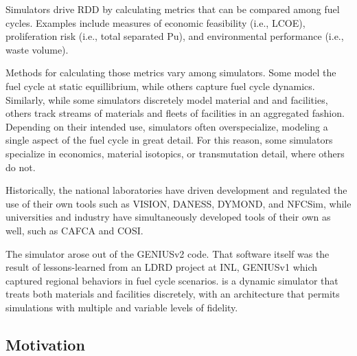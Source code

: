 

Simulators drive \gls{RDD} by calculating metrics that can be compared among fuel 
cycles. Examples include measures of economic feasibility (i.e., \gls{LCOE}), 
proliferation risk (i.e., total separated Pu), and environmental performance 
(i.e., waste volume). 

Methods for calculating those metrics vary among simulators. Some model the 
fuel cycle at static equillibrium, while others capture fuel cycle dynamics.  
Similarly, while some simulators discretely model material and and facilities, 
others track streams of materials and fleets of facilities in an aggregated 
fashion. Depending on their intended use, simulators often overspecialize, 
modeling a single aspect of the fuel cycle in great detail. For this reason, 
some simulators specialize in economics, material isotopics, or transmutation 
detail, where others do not. 

Historically, the national laboratories have driven development and regulated 
the use of their own tools such as \gls{VISION}\cite{jacobson_verifiable_2010}, 
\gls{DANESS}\cite{van_den_durpel_daness_2009}, 
\gls{DYMOND}\cite{modeling_yacout_2005}, and 
\gls{NFCSim}\cite{schneider_nfcsim:_2005}, while universities and industry have 
simultaneously developed tools of their own as well, such as 
\gls{CAFCA}\cite{guerin_benchmark_2006} and \gls{COSI}\cite{cosi}.

The \Cyclus simulator arose out of the 
\gls{GENIUSv2}\cite{oliver_studying_2009,huff_geniusv2_2009} code. That software 
itself was the result of lessons-learned from an \gls{LDRD} project at 
\gls{INL}, 
\gls{GENIUSv1}\cite{dunzik-gougar_global_2007,jain_transitioning_2006} which 
captured regional behaviors in fuel cycle scenarios. \Cyclus is a dynamic 
simulator that treats both materials and facilities discretely, with an 
architecture that permits simulations with multiple and variable levels of 
fidelity.

\subsection{Motivation}

